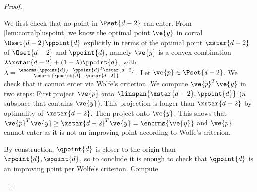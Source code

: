 \begin{proof}
\begin{claimproof}
{%
}
We first check that no point in $\Pset{d-2}$ can enter. 
From \cref{lem:corralpluspoint} we know the optimal point $\ve{y}$ in corral $\Oset{d-2} \ppoint{d}$ 
explicitly  in terms of the optimal point $\xstar{d-2}$ of $\Oset{d-2}$ and $\ppoint{d}$, namely 
$\ve{y}$ is a convex combination $\lambda \xstar{d-2}+ (1-\lambda) \ppoint{d}$, with $\lambda=\frac{\enorms{\ppoint{d}} - {\ppoint{d}}^T\xstar{d-2}}{\enorms{\ppoint{d}-\xstar{d-2}}}$. 
Let $\ve{p} \in \Pset{d-2}$. We check that it cannot enter via Wolfe's criterion. We compute $\ve{p}^T \ve{y}$ in two steps:
First project $\ve{p}$ onto $\linspan{ \xstar{d-2}, \ppoint{d}}$ (a subspace that contains $\ve{y}$).
This projection is longer than $\xstar{d-2}$ by optimality of $\xstar{d-2}$.
Then project onto $\ve{y}$.
This shows that $\ve{p}^T \ve{y} \geq {\xstar{d-2}}^T \ve{y} = \enorms{\ve{y}}$ and $\ve{p}$ cannot enter as it is not an improving point according to Wolfe's criterion.

By construction, $\qpoint{d}$ is closer to the origin than $\rpoint{d},\spoint{d}$, so to conclude it is enough to 
check that $\qpoint{d}$ is an improving point per Wolfe's criterion.
Compute





\end{claimproof}
\end{proof}
